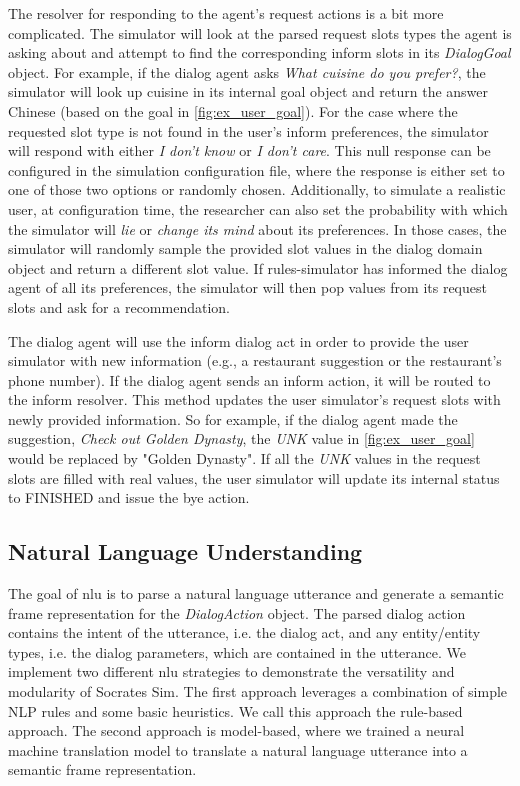 The resolver for responding to the agent's request actions is a bit more complicated. The simulator will look at the parsed request slots types the agent is asking about and attempt to find the corresponding inform slots in its \textit{DialogGoal} object. For example, if the dialog agent asks \textit{What cuisine do you prefer?}, the simulator will look up cuisine in its internal goal object and return the answer Chinese (based on the goal in \ref{fig:ex_user_goal}). For the case where the requested slot type is not found in the user's inform preferences, the simulator will respond with either\textit{ I don't know} or \textit{I don't care}. This null response can be configured in the simulation configuration file, where the response is either set to one of those two options or randomly chosen. Additionally, to simulate a realistic user, at configuration time, the researcher can also set the probability with which the simulator will \textit{lie} or \textit{change its mind } about its preferences. In those cases, the simulator will randomly sample the provided slot values in the dialog domain object and return a different slot value. If rules-simulator has informed the dialog agent of all its preferences, the simulator will then pop values from its request slots and ask for a recommendation. 

The dialog agent will use the inform dialog act in order to provide the user simulator with new information (e.g., a restaurant suggestion or the restaurant's phone number). If the dialog agent sends an inform action, it will be routed to the inform resolver. This method updates the user simulator's request slots with newly provided information. So for example, if the dialog agent made the suggestion, \textit{Check out Golden Dynasty}, the \textit{UNK} value in \ref{fig:ex_user_goal} would be replaced by "Golden Dynasty". If all the \textit{UNK} values in the request slots are filled with real values, the user simulator will update its internal status to FINISHED and issue the bye action. 

\subsection{Natural Language Understanding}
The goal of nlu is to parse a natural language utterance and generate a semantic frame representation for the \textit{DialogAction} object. The parsed dialog action contains the intent of the utterance, i.e. the dialog act, and any entity/entity types, i.e. the dialog parameters, which are contained in the utterance. We implement two different nlu strategies to demonstrate the versatility and modularity of Socrates Sim. The first approach leverages a combination of simple NLP rules and some basic heuristics. We call this approach the rule-based approach. The second approach is model-based, where we trained a neural machine translation model to translate a natural language utterance into a semantic frame representation. 

